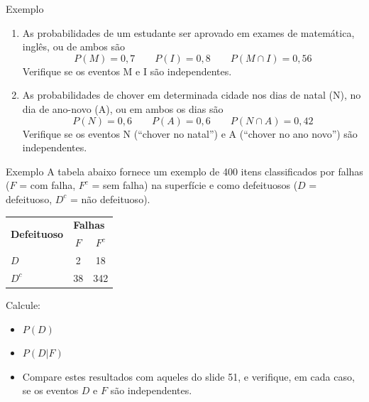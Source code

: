 \documentclass[10pt]{beamer}\usepackage[]{graphicx}\usepackage[]{color}
\theoremstyle{definition}
\begin{document}
\begin{frame}{Exemplo}
  \begin{enumerate}
  \item As probabilidades de um estudante ser aprovado em exames de
    matemática, inglês, ou de ambos são
    \begin{equation*}
      P(M) = 0,7 \qquad P(I) = 0,8 \qquad P(M \cap I) = 0,56
    \end{equation*}
    Verifique se os eventos M e I são independentes.
  \item As probabilidades de chover em determinada cidade nos
    dias de natal (N), no dia de ano-novo (A), ou em ambos os dias são
    \begin{equation*}
      P(N) = 0,6 \qquad P(A) = 0,6 \qquad P(N \cap A) = 0,42
    \end{equation*}
    Verifique se os eventos N (``chover no natal'') e A (``chover no ano
    novo'') são independentes.
  \end{enumerate}
\end{frame}

\begin{frame}{Exemplo}
  A tabela abaixo fornece um exemplo de 400 itens classificados por
  falhas ($F$ = com falha, $F^c$ = sem falha) na superfície e como
  defeituosos ($D$ = defeituoso, $D^c$ = não defeituoso).
  \begin{table}[!h]
    \centering
    \begin{tabular}{lcc}
      \hline
      \multirow{2}{*}{\textbf{Defeituoso}}
      & \multicolumn{2}{l}{\textbf{Falhas}} \\
      \cline{2-3}
                & $F$         & $F^c$       \\
      \hline
      $D$      & 2           & 18           \\
      $D^c$     & 38           & 342           \\
      \hline
    \end{tabular}
  \end{table}
  Calcule:
  \begin{itemize}
  \item $P(D)$
  \item $P(D|F)$
  \item Compare estes resultados com aqueles do slide 51, e verifique,
    em cada caso, se os eventos $D$ e $F$ são independentes.
  \end{itemize}
\end{frame}

\end{document}
